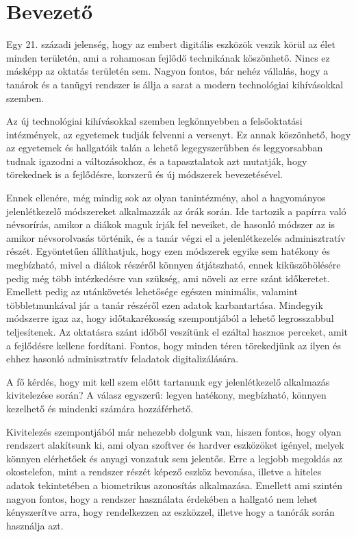 \chapter{Bevezető}%

Egy 21. századi jelenség, hogy az embert digitális eszközök veszik körül az élet minden területén, ami a rohamosan fejlődő technikának köszönhető. Nincs ez másképp az oktatás területén sem. Nagyon fontos, bár nehéz vállalás, hogy a tanárok és a tanügyi rendszer is állja a sarat a modern technológiai kihívásokkal szemben.

Az új technológiai kihívásokkal szemben legkönnyebben a felsőoktatási intézmények, az egyetemek tudják felvenni a versenyt. Ez annak köszönhető, hogy az egyetemek és hallgatóik talán a lehető legegyszerűbben és leggyorsabban tudnak igazodni a változásokhoz, és a tapasztalatok azt mutatják, hogy törekednek is a fejlődésre, korszerű és új módszerek bevezetésével.

Ennek ellenére, még mindig sok az olyan tanintézmény, ahol a hagyományos jelenlétkezelő módszereket alkalmazzák az órák során. Ide tartozik a papírra való névsorírás, amikor a diákok maguk írják fel neveiket, de hasonló módszer az is amikor névsorolvasás történik, és a tanár végzi el a jelenlétkezelés adminisztratív részét. 
Egyöntetűen állíthatjuk, hogy ezen módszerek egyike sem hatékony és megbízható, mivel a diákok részéről könnyen átjátszható, ennek kiküszöbölésére pedig még több intézkedésre van szükség, ami növeli az erre szánt időkeretet. Emellett pedig az utánkövetés lehetősége egészen minimális, valamint többletmunkával jár a tanár részéről ezen adatok karbantartása. Mindegyik módszerre igaz az, hogy időtakarékosság szempontjából a lehető legrosszabbul teljesítenek. Az oktatásra szánt időből veszítünk el ezáltal hasznos perceket, amit a fejlődésre kellene fordítani. Fontos, hogy minden téren törekedjünk az ilyen és ehhez hasonló adminisztratív feladatok digitalizálására.

A fő kérdés, hogy mit kell szem előtt tartanunk egy jelenlétkezelő alkalmazás kivitelezése során? A válasz egyszerű: legyen hatékony, megbízható, könnyen kezelhető és mindenki számára hozzáférhető.

Kivitelezés szempontjából már nehezebb dolgunk van, hiszen fontos, hogy olyan rendszert alakítsunk ki, ami olyan szoftver és hardver eszközöket igényel, melyek könnyen elérhetőek és anyagi vonzatuk sem jelentős. Erre a legjobb megoldás az okostelefon, mint a rendszer részét képező eszköz bevonása, illetve a hiteles adatok tekintetében a biometrikus azonosítás alkalmazása. Emellett ami szintén nagyon fontos, hogy a rendszer használata érdekében a hallgató nem lehet kényszerítve arra, hogy rendelkezzen az eszközzel, illetve hogy a tanórák során használja azt. 

